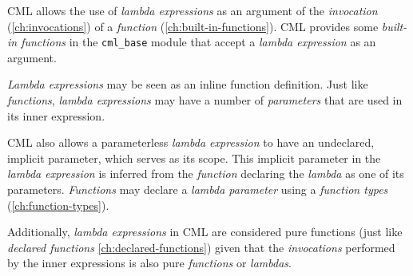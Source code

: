 CML allows the use of \emph{lambda expressions}
as an argument of the \emph{invocation} (\ref{ch:invocations})
of a \emph{function} (\ref{ch:built-in-functions}).
CML provides some \emph{built-in functions} in the \verb|cml_base| module
that accept a \emph{lambda expression} as an argument.

\emph{Lambda expressions} may be seen as an inline function definition.
Just like \emph{functions},
\emph{lambda expressions} may have a number of \emph{parameters}
that are used in its inner expression.

CML also allows a parameterless \emph{lambda expression}
to have an undeclared, implicit parameter,
which serves as its scope.
This implicit parameter in the \emph{lambda expression}
is inferred from the \emph{function}
declaring the \emph{lambda} as one of its parameters.
\emph{Functions} may declare a \emph{lambda parameter}
using a \emph{function types} (\ref{ch:function-types}).

Additionally, \emph{lambda expressions} in CML are considered
pure functions (just like \emph{declared functions} \ref{ch:declared-functions})
given that the \emph{invocations} performed by the inner expressions
is also pure \emph{functions} or \emph{lambdas}.
